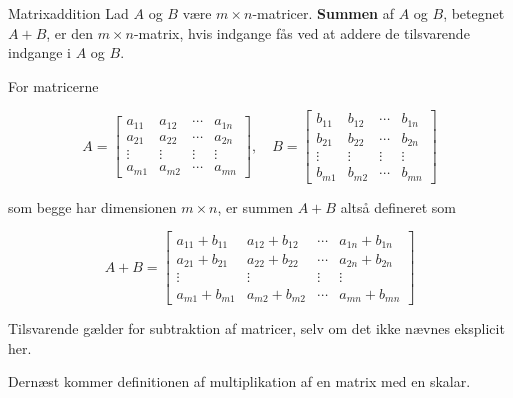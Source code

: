 \begin{definition}{Matrixaddition}
    Lad $A$ og $B$ være $m \times n$-matricer. \textbf{Summen} af $A$ og $B$, betegnet $A + B$, er den $m \times n$-matrix, hvis indgange fås ved at addere de tilsvarende indgange i $A$ og $B$.

    For matricerne

    $$
    A=\left[\begin{array}{cccc}
    a_{11} & a_{12} & \cdots & a_{1 n} \\
    a_{21} & a_{22} & \cdots & a_{2 n} \\
    \vdots & \vdots & \vdots & \vdots \\
    a_{m 1} & a_{m 2} & \cdots & a_{m n}
    \end{array}\right], \quad B=\left[\begin{array}{cccc}
    b_{11} & b_{12} & \cdots & b_{1 n} \\
    b_{21} & b_{22} & \cdots & b_{2 n} \\
    \vdots & \vdots & \vdots & \vdots \\
    b_{m 1} & b_{m 2} & \cdots & b_{m n}
    \end{array}\right]
    $$

    som begge har dimensionen $m \times n$, er summen $A+B$ altså defineret som

    $$
    A+B=\left[\begin{array}{cccc}
    a_{11}+b_{11} & a_{12}+b_{12} & \cdots & a_{1 n}+b_{1 n} \\
    a_{21}+b_{21} & a_{22}+b_{22} & \cdots & a_{2 n}+b_{2 n} \\
    \vdots & \vdots & \vdots & \vdots \\
    a_{m 1}+b_{m 1} & a_{m 2}+b_{m 2} & \cdots & a_{m n}+b_{m n}
    \end{array}\right]
    $$
\end{definition}

\begin{remark}
    Tilsvarende gælder for subtraktion af matricer, selv om det ikke nævnes eksplicit her.
\end{remark}

Dernæst kommer definitionen af multiplikation af en matrix med en skalar. \newpage

